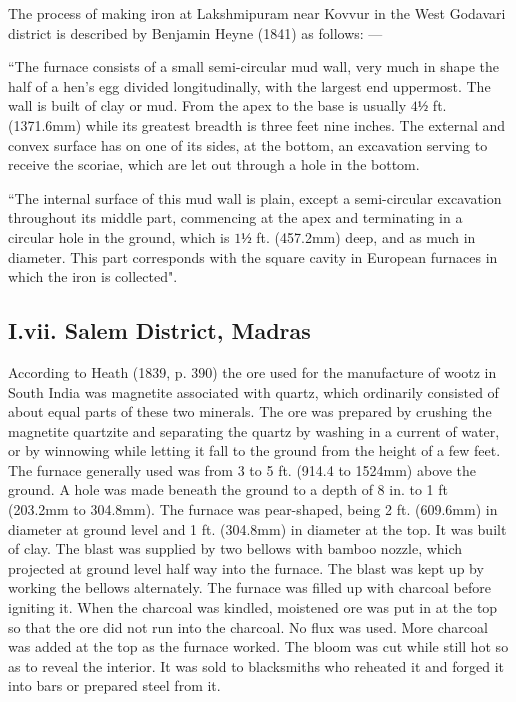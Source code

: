 \vspace{-.2cm}

The process of making iron at Lakshmipuram near Kovvur in the West Godavari district is described by Benjamin Heyne (1841) as follows: — 

\footnotesize{“The furnace consists of a small semi-circular mud wall, very much in shape the half of a hen’s egg divided longitudinally, with the largest end uppermost. The wall is built of clay or mud. From the apex to the base is usually $4½$ ft. (1371.6mm) while its greatest breadth is three feet nine inches. The external and convex surface has on one of its sides, at the bottom, an excavation serving to receive the scoriae, which are let out through a hole in the bottom.}

\footnotesize{``The internal surface of this mud wall is plain, except a semi-circular excavation throughout its middle part, commencing at the apex and terminating in a circular hole in the ground, which is $1½$ ft. (457.2mm) deep, and as much in diameter. This part corresponds with the square cavity in European furnaces in which the iron is collected".} 

\vspace{-.3cm}

\subsection*{I.vii.  Salem District, Madras}\label{subsection-7}

\vspace{-.2cm}

According to Heath (1839, p. 390) the ore used for the manufacture of wootz in South India was magnetite associated with quartz, which ordinarily consisted of about equal parts of these two minerals. The ore was prepared by crushing the magnetite quartzite and separating the quartz by washing in a current of water, or by winnowing while letting it fall to the ground from the height of a few feet. The furnace generally used was from 3 to 5 ft. (914.4 to 1524mm) above the ground. A hole was made beneath the ground to a depth of 8 in. to 1 ft (203.2mm to 304.8mm). The furnace was pear-shaped, being 2 ft. (609.6mm) in diameter at ground level and 1 ft. (304.8mm) in diameter at the top. It was built of clay. The blast was supplied by two bellows with bamboo nozzle, which projected at ground level half way into the furnace. The blast was kept up by working the bellows alternately. The furnace was filled up with charcoal before igniting it. When the charcoal was kindled, moistened ore was put in at the top so that the ore did not run into the charcoal. No flux was used.  More charcoal was added at the top as the furnace worked.  The bloom was cut while still hot so as to reveal the interior. It was sold to blacksmiths who reheated it and forged it into bars or prepared steel from it.

